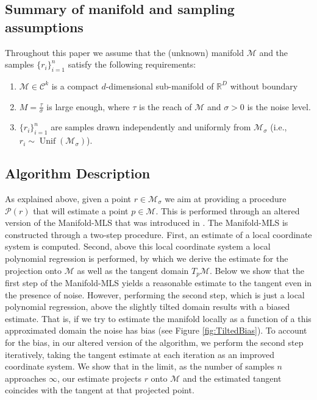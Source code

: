 \documentclass[12pt]{article}
\theoremstyle{remark}
\newcommand{\RR}{\mathbb{R}}
\newcommand{\MM}{\mathcal{M}}
\newcommand{\C}{\mathcal{C}}
\newcommand{\PP}{\mathcal{P}}
\begin{document}
\subsection{Summary of manifold and sampling assumptions}\label{sec:SamplingAssumptions}
Throughout this paper we assume that the (unknown) manifold $\MM$ and the samples $\{r_i\}_{i=1}^n$ satisfy the following requirements: 
\begin{enumerate}
    \item $\MM\in\C^k$ is a compact $d$-dimensional sub-manifold of $\RR^D$ without boundary
    \item $M = \frac{\tau}{\sigma}$ is large enough, where $\tau$ is the reach of $\MM$ and $\sigma>0$ is the noise level. 
    \label{assume:noise}
    \item $\{r_i\}_{i=1}^n$ are samples drawn independently and uniformly from $\MM_\sigma$ (i.e., $r_i\sim \operatorname{Unif}(\MM_\sigma)$).\label{assume:sampling}
\end{enumerate}

\subsection{Algorithm Description}\label{sec:Algorithm}
As explained above, given a point $r\in\MM_\sigma$ we aim at providing a procedure $\PP(r)$ that will estimate a point $ p \in \MM$. 
This is performed through an altered version of the Manifold-MLS that was introduced in \cite{sober2016MMLS}. 
The Manifold-MLS is constructed through a two-step procedure. 
First, an estimate of a local coordinate system is computed.
Second, above this local coordinate system a local polynomial regression is performed, by which we derive the estimate for the projection onto $\MM$ as well as the tangent domain $T_p\MM$.
Below we show that the first step of the Manifold-MLS yields a reasonable estimate to the tangent even in the presence of noise.
However, performing the second step, which is just a local polynomial regression, above the slightly tilted domain results with a biased estimate.
That is, if we try to estimate the manifold locally as a function of a this approximated domain the noise has bias (see Figure \ref{fig:TiltedBias}).
To account for the bias, in our altered version of the algorithm, we perform the second step iteratively, taking the tangent estimate at each iteration as an improved coordinate system.
We show that in the limit, as the number of samples $n$ approaches $\infty$, our estimate projects $r$ onto $\MM$ and the estimated tangent coincides with the tangent at that projected point.
\end{document}
